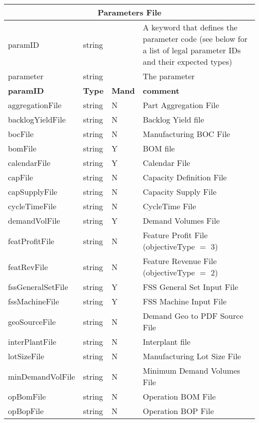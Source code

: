 \begin{minipage}{7.5in}
\begin{tabular}{lllp{3.5in}}
\multicolumn{4}{c}{{\bf Parameters File}}\\ 
     \hline\hline
paramID    &  string &    &  A keyword that defines the parameter code
                          (see below for a list of legal parameter IDs
                          and their expected types) \\
parameter  &  string   &  &  The parameter \\ \hline \hline
{\bf paramID}  &       {\bf Type} &  {\bf Mand} &   {\bf comment} \\ \hline
%
%
aggregationFile  & string &  N  &  Part Aggregation File\\
backlogYieldFile & string &  N  &  Backlog Yield file \\
bocFile          & string &  N  &  Manufacturing BOC File \\
bomFile          & string &  Y  &  BOM file\\
calendarFile     & string &  Y  &  Calendar File \\
capFile          & string &  N  &  Capacity Definition File \\
capSupplyFile    & string &  N  &  Capacity Supply File \\
cycleTimeFile    & string &  N  &  CycleTime File\\
demandVolFile    & string &  Y  &  Demand Volumes File\\
featProfitFile   & string &  N  &  Feature Profit File (objectiveType $=$ 3)\\
featRevFile      & string &  N  &  Feature Revenue File (objectiveType $=$ 2)\\
fssGeneralSetFile & string & Y &  FSS General Set Input File \\
fssMachineFile   & string & Y &  FSS Machine Input File \\
geoSourceFile    & string &  N  &  Demand Geo to PDF Source File \\
interPlantFile   & string &  N  &  Interplant file \\
lotSizeFile      & string &  N  &  Manufacturing Lot Size File \\
minDemandVolFile & string &  N  &  Minimum Demand Volumes File\\
opBomFile & string & N & Operation BOM File \\
opBopFile & string & N & Operation BOP File \\

\end{tabular}
\end{minipage}
